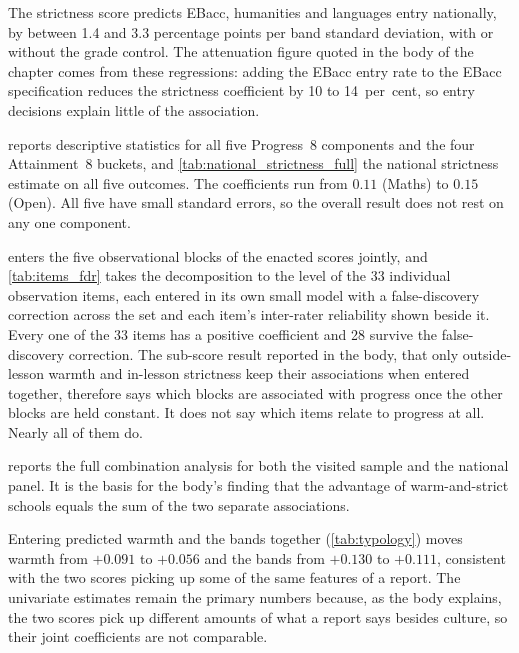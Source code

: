 The strictness score predicts EBacc, humanities and languages entry nationally, by between 1.4 and 3.3 percentage points per band standard deviation, with or without the grade control. The attenuation figure
quoted in the body of the chapter comes from these regressions: adding the EBacc entry rate to the EBacc specification reduces the strictness coefficient by 10 to 14~per~cent, so entry decisions explain little of the association.






 reports descriptive statistics for all five
Progress~8 components and the four Attainment~8 buckets, and
\cref{tab:national_strictness_full} the national strictness estimate on
all five outcomes. The coefficients run from $0.11$ (Maths) to $0.15$
(Open). All five have small standard errors, so the overall result does not rest on any one component.




 enters the five observational blocks of the enacted scores jointly, and \cref{tab:items_fdr} takes the decomposition to the
level of the 33 individual observation items, each entered in its own
small model with a false-discovery correction across the set and each
item's inter-rater reliability shown beside it. Every one of the 33 items has a positive coefficient and 28 survive the false-discovery correction. The sub-score result reported in the body, that only outside-lesson warmth and in-lesson strictness keep their associations when entered together, therefore says which blocks are associated with progress once the other blocks are held constant. It does not say which items relate to progress at all. Nearly all of them do.





 reports the full combination analysis for both the visited sample and the national panel. It is the basis for the body's finding that the advantage of warm-and-strict schools equals the sum of the two separate associations.

Entering predicted warmth and the bands together (\cref{tab:typology}) moves warmth from $+0.091$ to $+0.056$ and the bands from $+0.130$ to $+0.111$, consistent with the two scores picking up some of the same features of a report. The univariate estimates remain the primary numbers because, as the body explains, the two scores pick up different amounts of what a report says besides culture, so their joint coefficients are not comparable.


